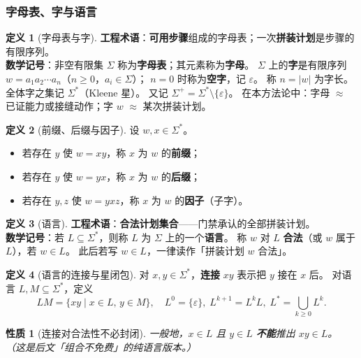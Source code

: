 \documentclass[UTF8,a4paper,11pt]{ctexart}
\theoremstyle{definition}
\newtheorem{definition}{定义}[section]
\theoremstyle{plain}
\newtheorem{property}{性质}[section]
\theoremstyle{remark}
\numberwithin{figure}{section}
\numberwithin{table}{section}
\begin{document}
\subsubsection{字母表、字与语言}
\label{sec:words-lang}
\begin{definition}[字母表与字]
\label{def:alphabet-word}
\textbf{工程术语}：\textbf{可用步骤}组成的字母表；一次\textbf{拼装计划}是步骤的有限序列。\\
\textbf{数学记号}：非空有限集 $\Sigma$ 称为\textbf{字母表}；其元素称为\textbf{字母}。
$\Sigma$ 上的\textbf{字}是有限序列 $w=a_1a_2\cdots a_n$（$n\ge 0$，$a_i\in\Sigma$）；
$n=0$ 时称为\textbf{空字}，记 $\varepsilon$。
称 $n=|w|$ 为字长。全体字之集记 $\Sigma^*$（Kleene 星）。
又记 $\Sigma^+=\Sigma^*\setminus\{\varepsilon\}$。
在本方法论中：字母 $\approx$ 已证能力或接缝动作；字 $w$ $\approx$ 某次拼装计划。
\end{definition}

\begin{definition}[前缀、后缀与因子]
设 $w,x\in\Sigma^*$。
\begin{itemize}
  \item 若存在 $y$ 使 $w=xy$，称 $x$ 为 $w$ 的\textbf{前缀}；
  \item 若存在 $y$ 使 $w=yx$，称 $x$ 为 $w$ 的\textbf{后缀}；
  \item 若存在 $y,z$ 使 $w=yxz$，称 $x$ 为 $w$ 的\textbf{因子}（子字）。
\end{itemize}
\end{definition}

\begin{definition}[语言]
\label{def:language}
\textbf{工程术语}：\textbf{合法计划集合}——门禁承认的全部拼装计划。\\
\textbf{数学记号}：若 $L\subseteq\Sigma^*$，则称 $L$ 为 $\Sigma$ 上的一个\textbf{语言}。
称 $w$ 对 $L$ \textbf{合法}（或 $w$ 属于 $L$），若 $w\in L$。
此后若写 $w\in L$，一律读作「拼装计划 $w$ 合法」。
\end{definition}

\begin{definition}[语言的连接与星闭包]
对 $x,y\in\Sigma^*$，\textbf{连接} $xy$ 表示把 $y$ 接在 $x$ 后。
对语言 $L,M\subseteq\Sigma^*$，定义
\[
LM=\{xy\mid x\in L,\,y\in M\},
\quad
L^{0}=\{\varepsilon\},\;
L^{k+1}=L^{k}L,\;
L^{*}=\bigcup_{k\ge 0}L^{k}.
\]
\end{definition}

\begin{property}[连接对合法性不必封闭]
一般地，$x\in L$ 且 $y\in L$ \textbf{不能}推出 $xy\in L$。
（这是后文「组合不免费」的纯语言版本。）
\end{property}
\end{document}
